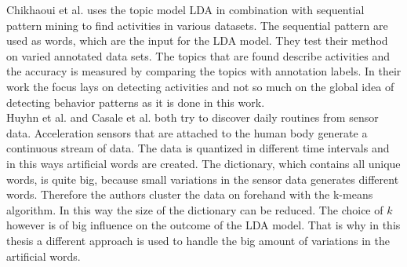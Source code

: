 Chikhaoui et al. \cite{journals/percom/ChikhaouiWP12} uses the topic model LDA in combination with sequential pattern mining to find activities in various datasets. The sequential pattern are used as words, which are the input for the LDA model.  They test their method on varied annotated data sets. The topics that are found describe activities and the accuracy is measured by comparing the topics with annotation labels. In their work the focus lays on detecting activities and not so much on the global idea of detecting behavior patterns as it is done in this work.\\

Huyhn et al. \cite{Huynh:2008:DAP:1409635.1409638} and Casale et al. \cite{Casale:2009} both try to discover daily routines from sensor data. Acceleration sensors that are attached to the human body generate a continuous stream of data. The data is quantized in different time intervals and in this ways artificial words are created. The dictionary, which contains all unique words, is quite big, because small variations in the sensor data generates different words. Therefore the authors cluster the data on forehand with the k-means algorithm. In this way the size of the dictionary can be reduced. The choice of $k$ however is of big influence on the outcome of the LDA model. That is why in this thesis a different approach is used to handle the big amount of variations in the artificial words.\\


% 
% 
% 
% 
% 

